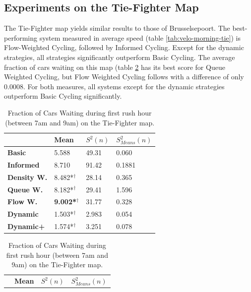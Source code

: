 \documentclass[11pt]{article}
\begin{document}
\subsection{Experiments on the Tie-Fighter Map}
The Tie-Fighter map yields similar results to those of Brusselsepoort. The best-performing system measured in average speed (table \ref{tab:velo-morning-tie}) is Flow-Weighted Cycling, followed by Informed Cycling. Except for the dynamic strategies, all strategies significantly outperform Basic Cycling. The average fraction of cars waiting on this map (table \ref{tab:waiting-morning-tie} has its best score for Queue Weighted Cycling, but Flow Weighted Cycling follows with a difference of only 0.0008. For both measures, all systems except for the dynamic strategies outperform Basic Cycling significantly.

\begin{table}[H]
\centering
\caption{Average Velocity of Cars during first rush hour (between 7am and 9am) on the Tie-Fighter map.}
\label{tab:velo-morning-tie}
\begin{tabular}{l|l|l|l|}
\textbf{}                 & \textbf{Mean} & \textbf{$S^2(n)$} & \textbf{$S_{Means}^2(n)$} \\
\hline\textbf{Basic}            & 5.588          & 49.31             & 0.060                      \\
\textbf{Informed}         & 8.710          & 91.42             & 0.1881                     \\
\hline\textbf{Density W.} & 8.482*$^\dagger$          & 28.14             & 0.365                      \\
\textbf{Queue W.}   & 8.182*$^\dagger$          & 29.41             & 1.596                      \\
\textbf{Flow W.}    & \textbf{9.002*$^\dagger$} & 31.77             & 0.328                      \\
\textbf{Dynamic}          & 1.503*$^\dagger$          & 2.983             & 0.054                      \\
\textbf{Dynamic+}         & 1.574*$^\dagger$          & 3.251             & 0.078                   
\end{tabular}
\vspace{20pt}
\centering
\caption{Fraction of Cars Waiting during first rush hour (between 7am and 9am) on the Tie-Fighter map.}
\label{tab:waiting-morning-tie}
\begin{tabular}{l|l|l|l|}
\textbf{}                 & \textbf{Mean} & \textbf{$S^2(n)$} & \textbf{$S_{Means}^2(n)$} \\

\end{tabular}
\end{table}
\end{document}
